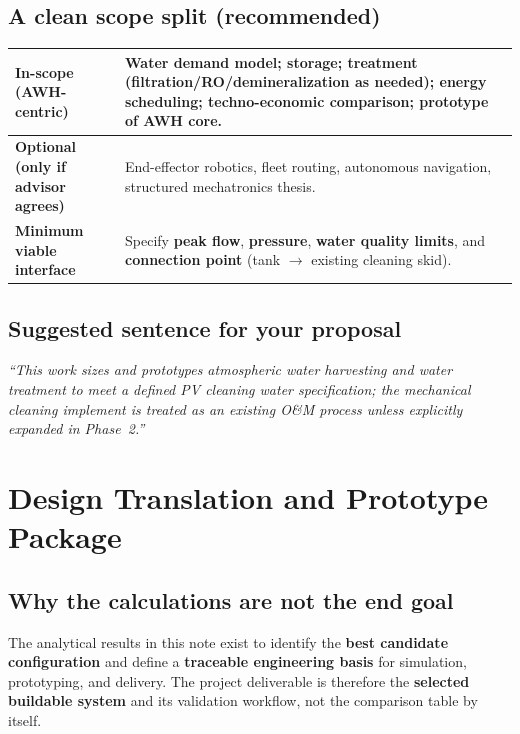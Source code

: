 \documentclass[11pt,a4paper]{article}
\begin{document}
\subsection{A clean scope split (recommended)}
\begin{table}[h]
\centering
\begin{tabular}{@{}p{4.2cm}p{10.5cm}@{}}
\toprule
\textbf{In-scope (AWH-centric)} & Water demand model; storage; treatment (filtration/RO/demineralization as needed); energy scheduling; techno-economic comparison; prototype of \textbf{AWH core}. \\
\midrule
\textbf{Optional (only if advisor agrees)} & End-effector robotics, fleet routing, autonomous navigation, structured mechatronics thesis. \\
\midrule
\textbf{Minimum viable interface} & Specify \textbf{peak flow}, \textbf{pressure}, \textbf{water quality limits}, and \textbf{connection point} (tank $\rightarrow$ existing cleaning skid). \\
\bottomrule
\end{tabular}
\end{table}

\subsection{Suggested sentence for your proposal}
\textit{``This work sizes and prototypes atmospheric water harvesting and water treatment to meet a defined PV cleaning water specification; the mechanical cleaning implement is treated as an existing O\&M process unless explicitly expanded in Phase~2.''}

\section{Design Translation and Prototype Package}
\subsection{Why the calculations are not the end goal}
The analytical results in this note exist to identify the \textbf{best candidate configuration} and define a \textbf{traceable engineering basis} for simulation, prototyping, and delivery. The project deliverable is therefore the \textbf{selected buildable system} and its validation workflow, not the comparison table by itself.
\end{document}
